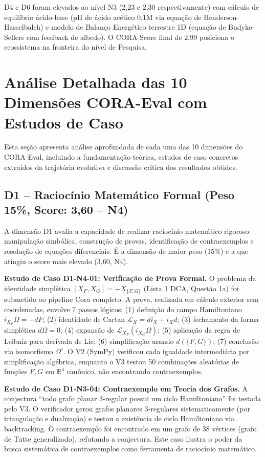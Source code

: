 D4 e D6 foram elevados ao nível N3 (2,23 e 2,30 respectivamente) com
cálculo de equilíbrio ácido-base (pH de ácido acético 0,1M via equação
de Henderson-Hasselbalch) e modelo de Balanço Energético terrestre 1D
(equação de Budyko-Sellers com feedback de albedo). O CORA-Score final
de 2,99 posiciona o ecossistema na fronteira do nível de Pesquisa.

\section{Análise Detalhada das 10 Dimensões CORA-Eval com Estudos de Caso}

Esta seção apresenta análise aprofundada de cada uma das 10 dimensões do
CORA-Eval, incluindo a fundamentação teórica, estudos de caso concretos
extraídos da trajetória evolutiva e discussão crítica dos resultados
obtidos.

\subsection{D1 -- Raciocínio Matemático Formal (Peso 15\%, Score: 3,60 -- N4)}

A dimensão D1 avalia a capacidade de realizar raciocínio matemático
rigoroso: manipulação simbólica, construção de provas, identificação de
contraexemplos e resolução de equações diferenciais. É a dimensão de
maior peso (15\%) e a que atingiu o score mais elevado (3,60, N4).

\textbf{Estudo de Caso D1-N4-01: Verificação de Prova Formal.} O
problema da identidade simplética $[X_F, X_G] = -X_{\{F,G\}}$ (Lista 1
DCA, Questão 1a) foi submetido ao pipeline Cora completo. A prova,
realizada em cálculo exterior sem coordenadas, envolve 7 passos lógicos:
(1) definição do campo Hamiltoniano $i_{X_F}\Omega = -dF$; (2) identidade
de Cartan $\mathcal{L}_X = di_X + i_Xd$; (3) fechamento da forma
simplética $d\Omega = 0$; (4) expansão de $\mathcal{L}_{X_F}(i_{X_G}\Omega)$;
(5) aplicação da regra de Leibniz para derivada de Lie; (6) simplificação
usando $d(\{F,G\})$; (7) conclusão via isomorfismo $\Omega^\flat$. O V2
(SymPy) verificou cada igualdade intermediária por simplificação
algébrica, enquanto o V3 testou 50 combinações aleatórias de funções
$F,G$ em $\mathbb{R}^4$ canônico, não encontrando contraexemplos.

\textbf{Estudo de Caso D1-N3-04: Contraexemplo em Teoria dos Grafos.} A
conjectura ``todo grafo planar 3-regular possui um ciclo Hamiltoniano''
foi testada pelo V3. O verificador gerou grafos planares 3-regulares
sistematicamente (por triangulação e dualização) e testou a existência de
ciclo Hamiltoniano via backtracking. O contraexemplo foi encontrado em um
grafo de 38 vértices (grafo de Tutte generalizado), refutando a
conjectura. Este caso ilustra o poder da busca sistemática de
contraexemplos como ferramenta de raciocínio matemático.

